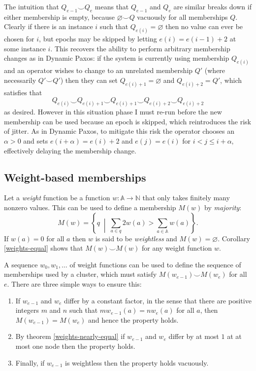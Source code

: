 \documentclass[journal]{IEEEtran}
\begin{document}
The intuition that $Q_{e-1} \smile Q_e$ means that $Q_{e-1}$ and $Q_e$ are
similar breaks down if either membership is empty, because $\varnothing \smile
Q$ vacuously for all memberships $Q$. Clearly if there is an instance $i$ such
that $Q_{e(i)} = \varnothing$ then no value can ever be chosen for $i$, but
epochs may be skipped by letting $e(i) = e(i-1) + 2$ at some instance $i$.
This recovers the ability to perform arbitrary membership changes as in Dynamic
Paxos: if the system is currently using membership $Q_{e(i)}$ and an operator
wishes to change to an unrelated membership $Q'$ (where necessarily $Q' \smile
Q'$) then they can set $Q_{e(i)+1} = \varnothing$ and $Q_{e(i)+2} = Q'$, which
satisfies that \[Q_{e(i)} \smile Q_{e(i) + 1} \smile Q_{e(i)+1} \smile Q_{e(i)
+ 2} \smile Q_{e(i) + 2}\] as desired. However in this situation phase I must
re-run before the new membership can be used because an epoch is skipped, which
reintroduces the risk of jitter. As in Dynamic Paxos, to mitigate this risk the
operator chooses an $\alpha > 0$ and sets $e(i+\alpha) = e(i)+2$ and $e(j) =
e(i)$ for $i < j \le i + \alpha$, effectively delaying the membership change.

\subsection{Weight-based memberships}
\label{weight-based-memberships}

Let a \textit{weight} function be a function $w : \mathbb A \to \mathbb N$ that
only takes finitely many nonzero values. This can be used to define a
membership $M(w)$ by \textit{majority}: \[M(w) = \left\{ q \;\middle|\; \sum_{a
\in q} 2 w(a) > \sum_{a \in \mathbb A} w(a) \right\}.\] If $w(a) = 0$ for all
$a$ then $w$ is said to be \textit{weightless} and $M(w) = \varnothing$.
Corollary \ref{weights-equal} shows that $M(w) \smile M(w)$ for any weight
function $w$.

A sequence $w_0, w_1, \ldots$ of weight functions can be used to define the
sequence of memberships used by a cluster, which must satisfy $M(w_{e-1})
\smile M(w_e)$ for all $e$.  There are three simple ways to ensure this:

\begin{enumerate}

\item If $w_{e-1}$ and $w_e$ differ by a constant factor, in the sense that
there are positive integers $m$ and $n$ such that $m w_{e-1}(a) = n w_e(a)$
for all $a$, then ${M(w_{e-1}) = M(w_e)}$ and hence the property holds.

\item By theorem \ref{weights-nearly-equal} if $w_{e-1}$ and $w_e$
differ by at most $1$ at at most one node then the property holds.

\item Finally, if $w_{e-1}$ is weightless then the property holds vacuously.

\end{enumerate}
\end{document}
